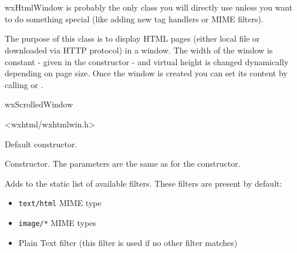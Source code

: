 %
%

\section{}\label{wxhtmlwindow}

wxHtmlWindow is probably the only class you will directly use
unless you want to do something special (like adding new tag
handlers or MIME filters).

The purpose of this class is to display HTML pages (either local
file or downloaded via HTTP protocol) in a window. The width
of the window is constant - given in the constructor - and virtual height
is changed dynamically depending on page size.
Once the window is created you can set its content by calling
 or 
. 


wxScrolledWindow


<wxhtml/wxhtmlwin.h>

\label{wxhtmlwindowwxhtmlwindow}


Default constructor.


Constructor. The parameters are the same as for the  constructor.



\label{wxhtmlwindowaddfilter}


Adds  to the static list of available
filters. These filters are present by default:

\begin{itemize}\itemsep=0pt
\item {\tt text/html} MIME type
\item {\tt image/*} MIME types
\item Plain Text filter (this filter is used if no other filter matches)
\end{itemize}

